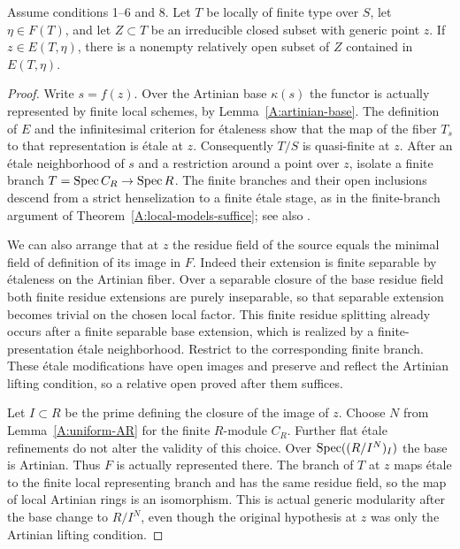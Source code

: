 \begin{lemma}
\label{A:generic-thickening-reflection}
Assume conditions 1--6 and 8.  Let $T$ be locally of finite type
over $S$, let $\eta\in F(T)$, and let $Z\subset T$ be an
irreducible closed subset with generic point $z$.
If $z\in E(T,\eta)$, there is a nonempty relatively open
subset of $Z$ contained in $E(T,\eta)$.
\end{lemma}
\begin{proof}
Write $s=f(z)$.  Over the Artinian base $\kappa(s)$ the functor
is actually represented by finite local schemes, by
Lemma~\ref{A:artinian-base}.  The definition of $E$ and the
infinitesimal criterion for \'etaleness show that the map of
the fiber $T_s$ to that representation is \'etale at $z$.
Consequently $T/S$ is quasi-finite at $z$.
After an \'etale neighborhood of $s$ and a restriction around
a point over $z$, isolate a finite branch
$T=\operatorname{Spec} C_R\to\operatorname{Spec} R$.  The finite branches and their open
inclusions descend from a strict henselization to a finite
\'etale stage, as in the finite-branch argument of
Theorem~\ref{A:local-models-suffice}; see also
\cite[Lemmas 10.153.4 and 10.153.6]{StacksHenselianBranches}.

We can also arrange that at $z$ the residue field of the source
equals the minimal field of definition of its image in $F$.
Indeed their extension is finite separable by \'etaleness on
the Artinian fiber.  Over a separable closure of the base
residue field both finite residue extensions are purely
inseparable, so that separable extension becomes trivial on
the chosen local factor.  This finite residue splitting already
occurs after a finite separable base extension, which is realized
by a finite-presentation \'etale neighborhood.  Restrict to the
corresponding finite branch.  These \'etale modifications have
open images and preserve and reflect the Artinian lifting
condition, so a relative open proved after them suffices.

Let $I\subset R$ be the prime defining the closure of the image
of $z$.  Choose $N$ from Lemma~\ref{A:uniform-AR} for the finite
$R$-module $C_R$.  Further flat \'etale refinements do not alter
the validity of this choice.  Over
$\operatorname{Spec}((R/I^N)_I)$ the base is Artinian.  Thus $F$ is actually
represented there.  The branch of $T$ at $z$ maps \'etale to
the finite local representing branch and has the same residue
field, so the map of local Artinian rings is an isomorphism.
This is actual generic modularity after the base change to
$R/I^N$, even though the original hypothesis at $z$ was only
the Artinian lifting condition.


\end{proof}
